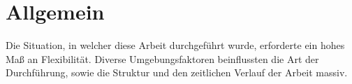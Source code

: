 \section{Allgemein}

Die Situation, in welcher diese Arbeit durchgeführt wurde, erforderte ein hohes Maß an Flexibilität.
Diverse Umgebungsfaktoren beinflussten die Art der Durchführung, sowie die Struktur und den zeitlichen Verlauf der Arbeit massiv.